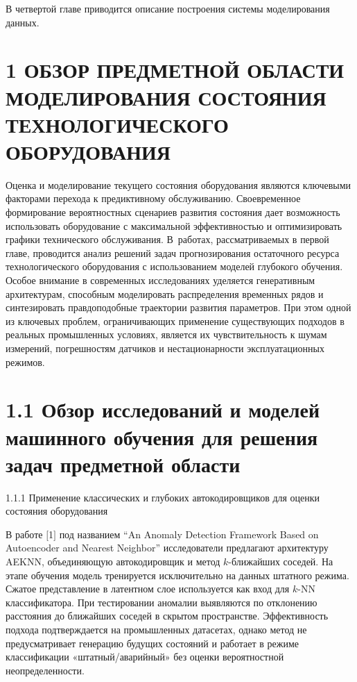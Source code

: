 \documentclass[14pt, a4paper, oneside]{extreport}
\begin{document}
В четвертой главе приводится описание построения системы моделирования данных.

\clearpage



\section{1 ОБЗОР ПРЕДМЕТНОЙ ОБЛАСТИ МОДЕЛИРОВАНИЯ СОСТОЯНИЯ ТЕХНОЛОГИЧЕСКОГО ОБОРУДОВАНИЯ}
\vspace{1em}
Оценка и моделирование текущего состояния оборудования являются ключевыми факторами перехода к предиктивному обслуживанию. Своевременное формирование вероятностных сценариев развития состояния дает возможность использовать оборудование с максимальной эффективностью и оптимизировать графики технического обслуживания. В~работах, рассматриваемых в первой главе, проводится анализ решений задач прогнозирования остаточного ресурса технологического оборудования с использованием моделей глубокого обучения. Особое внимание в современных исследованиях уделяется генеративным архитектурам, способным моделировать распределения временных рядов и синтезировать правдоподобные траектории развития параметров. При этом одной из ключевых проблем, ограничивающих применение существующих подходов в реальных промышленных условиях, является их чувствительность к шумам измерений, погрешностям датчиков и нестационарности эксплуатационных режимов.

\vspace{1em}
\section{1.1 Обзор исследований и моделей машинного обучения для решения  задач предметной области}
{1.1.1 Применение классических и глубоких автокодировщиков для оценки состояния оборудования}
\vspace{1em}

В работе $[$1$]$ под названием “An Anomaly Detection Framework Based on Autoencoder and Nearest Neighbor” исследователи предлагают архитектуру AEKNN, объединяющую автокодировщик и метод $k$-ближайших соседей. На этапе обучения модель тренируется исключительно на данных штатного режима. Сжатое представление в латентном слое используется как вход для $k$-NN классификатора. При тестировании аномалии выявляются по отклонению расстояния до ближайших соседей в скрытом пространстве. Эффективность подхода подтверждается на промышленных датасетах, однако метод не предусматривает генерацию будущих состояний и работает в режиме классификации «штатный/аварийный» без оценки вероятностной неопределенности.
\end{document}
